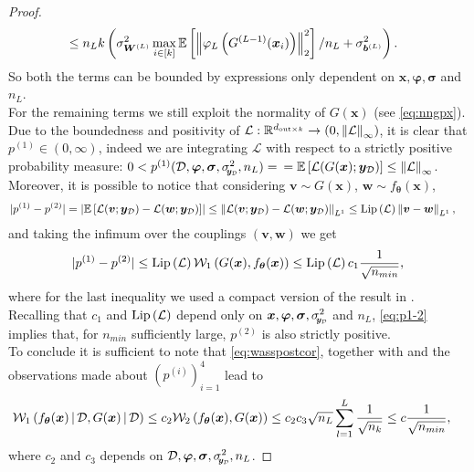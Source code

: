 \begin{proof}
\begin{align}
		& \leq n_L k \left(\sigma_{\bm{W}^{(L)}}^2 \max_{i \in [k]} \mean{\norm{\varphi_{L}\left(G^{(L - 1)}(\bm{x}_i)\right)}_2^2} / n_L + \sigma_{\bm{b}^{(L)}}^2\right).
	\end{align} 
	So both the terms can be bounded by expressions only dependent on $\bm{x}, \bm{\varphi}, \bm{\sigma}$ and $n_L$. \\
	For the remaining terms we still exploit the normality of $G(\bm{x})$ (see \cref{eq:nngpx}). 
	Due to the boundedness and positivity of $\mathcal{L}: \real^{d_{\mathrm{out} \times k}} \to (0, \norm{\mathcal{L}}_{\infty})$, it is clear that $p^{(1)} \in (0, \infty)$, indeed we are integrating $\mathcal{L}$ with respect to a strictly positive probability measure: $0 < p^{(1)}(\train, \bm{\varphi}, \bm{\sigma}, \sigmay^2, n_L) =$ $= \mean{\mathcal{L}(G(\bm{x}); \bm{y}_{\mathcal{D}})} \leq \norm{\mathcal{L}}_{\infty}$. \\
	Moreover, it is possible to notice that considering $\bm{v} \sim G(\bm{x})$, $\bm{w} \sim f_{\bm{\theta}}(\bm{x})$,
	\begin{align*}
		|p^{(1)} - p^{(2)}| & = \left|\mean{\mathcal{L}(\bm{v}; \bm{y}_{\mathcal{D}}) - \mathcal{L}(\bm{w}; \bm{y}_{\mathcal{D}})}\right| \leq \norm{\mathcal{L}(\bm{v}; \bm{y}_{\mathcal{D}}) - \mathcal{L}(\bm{w}; \bm{y}_{\mathcal{D}})}_{L^1} \leq \lipschitz{\mathcal{L}} \norm{\bm{v} - \bm{w}}_{L^1},
	\end{align*}
	and taking the infimum over the couplings $(\bm{v}, \bm{w})$ we get
	\begin{align} \label{eq:p1-2}
		|p^{(1)} - p^{(2)}| \leq \lipschitz{\mathcal{L}} \wass[1]{G(\bm{x})}{f_{\bm{\theta}}(\bm{x})} \leq \lipschitz{\mathcal{L}} c_1 \frac{1}{\sqrt{n_{min}}},
	\end{align}
	where for the last inequality we used a compact version of the result in . Recalling that $c_1$ and $\lipschitz{\mathcal{L}}$ depend only on $\bm{x}, \bm{\varphi}, \bm{\sigma}, \sigmay^2$ and $n_L$, \cref{eq:p1-2} implies that, for $n_{min}$ sufficiently large, $p^{(2)}$  is also strictly positive. \\
	To conclude it is sufficient to note that \cref{eq:wasspostcor}, together with  and the observations made about $(p^{(i)})_{i = 1}^4$ lead to
	\begin{align*}
		\wass[1]{f_{\bm{\theta}}(\bm{x}) \given \train}{G(\bm{x}) \given \train} & \leq c_2 \wass[2]{f_{\bm{\theta}}(\bm{x})}{G(\bm{x})} \leq c_2 c_3 \sqrt{n_L} \sum_{l = 1}^{L} \frac{1}{\sqrt{n_k}} \leq c \frac{1}{\sqrt{n_{min}}},
	\end{align*}
	where $c_2$ and $c_3$ depends on $\train, \bm{\varphi}, \bm{\sigma}, \sigmay^2, n_L$.
\end{proof}

